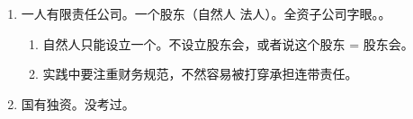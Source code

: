 \begin{enumerate}
\begin{enumerate}
\begin{enumerate}
                \end{enumerate}
          \item 监事会。3 人以上。监事主席 \yjt 监事过半数、3 年一届。考的少，不做记忆要求。
                \begin{enumerate}
                  \item 代表公司参加诉讼。
                  \item 聘请协助调查。费用公司承担。
                  \item 必须要有职工代表，董高不得兼任。
                  \item 决议半数通过。
                  \item 简化制度。规模小 \hz 股东人数少，可设 1 - 2 名监事代替监事会。
                \end{enumerate}
          \item 法定代表人。董事长、执行董事、经理 3 选 1。以公司名义起诉。
        \end{enumerate}
  \item 一人有限责任公司。一个股东（自然人 \hz 法人）。全资子公司字眼。。
        \begin{enumerate}
          \item 自然人只能设立一个。不设立股东会，或者说这个股东 = 股东会。
          \item 实践中要注重财务规范，不然容易被打穿承担连带责任。
        \end{enumerate}
  \item 国有独资。没考过。
\end{enumerate}
